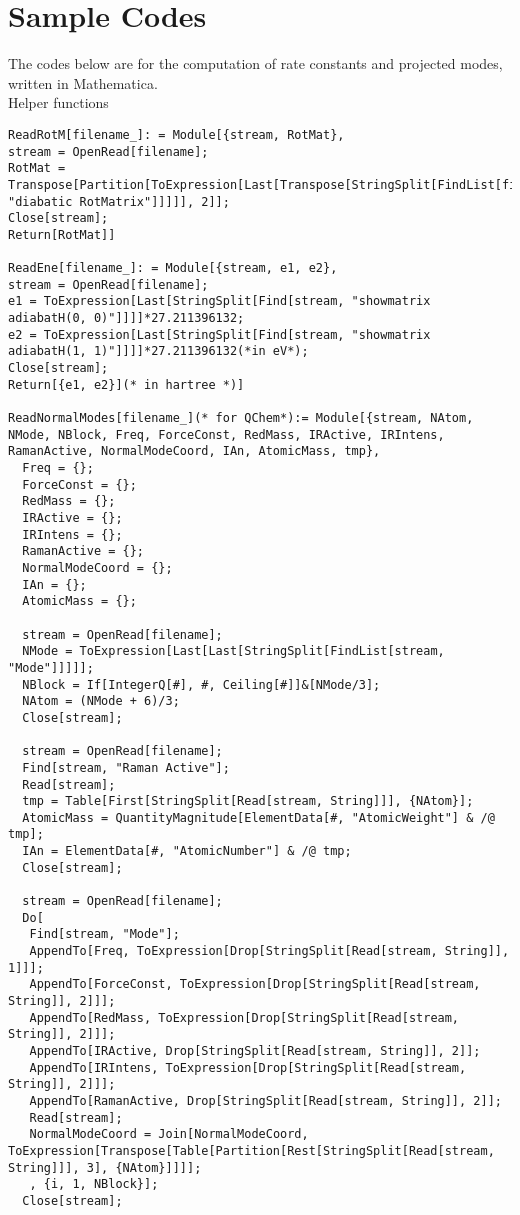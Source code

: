 \chapter{Sample Codes}
The codes below are for the computation of rate constants and projected modes, written in Mathematica.
\\\large{Helper functions}
\begin{lstlisting}
ReadRotM[filename_]: = Module[{stream, RotMat},
stream = OpenRead[filename];
RotMat = Transpose[Partition[ToExpression[Last[Transpose[StringSplit[FindList[filename, "diabatic RotMatrix"]]]]], 2]];
Close[stream];
Return[RotMat]]

ReadEne[filename_]: = Module[{stream, e1, e2},
stream = OpenRead[filename];
e1 = ToExpression[Last[StringSplit[Find[stream, "showmatrix adiabatH(0, 0)"]]]]*27.211396132;
e2 = ToExpression[Last[StringSplit[Find[stream, "showmatrix adiabatH(1, 1)"]]]]*27.211396132(*in eV*);
Close[stream];
Return[{e1, e2}](* in hartree *)]

ReadNormalModes[filename_](* for QChem*):= Module[{stream, NAtom, NMode, NBlock, Freq, ForceConst, RedMass, IRActive, IRIntens, RamanActive, NormalModeCoord, IAn, AtomicMass, tmp},
  Freq = {};
  ForceConst = {};
  RedMass = {};
  IRActive = {};
  IRIntens = {};
  RamanActive = {};
  NormalModeCoord = {};
  IAn = {};
  AtomicMass = {};

  stream = OpenRead[filename];
  NMode = ToExpression[Last[Last[StringSplit[FindList[stream, "Mode"]]]]];
  NBlock = If[IntegerQ[#], #, Ceiling[#]]&[NMode/3];
  NAtom = (NMode + 6)/3;
  Close[stream];

  stream = OpenRead[filename];
  Find[stream, "Raman Active"];
  Read[stream];
  tmp = Table[First[StringSplit[Read[stream, String]]], {NAtom}];
  AtomicMass = QuantityMagnitude[ElementData[#, "AtomicWeight"] & /@ tmp];
  IAn = ElementData[#, "AtomicNumber"] & /@ tmp;
  Close[stream];

  stream = OpenRead[filename];
  Do[
   Find[stream, "Mode"];
   AppendTo[Freq, ToExpression[Drop[StringSplit[Read[stream, String]], 1]]];
   AppendTo[ForceConst, ToExpression[Drop[StringSplit[Read[stream, String]], 2]]];
   AppendTo[RedMass, ToExpression[Drop[StringSplit[Read[stream, String]], 2]]];
   AppendTo[IRActive, Drop[StringSplit[Read[stream, String]], 2]];
   AppendTo[IRIntens, ToExpression[Drop[StringSplit[Read[stream, String]], 2]]];
   AppendTo[RamanActive, Drop[StringSplit[Read[stream, String]], 2]];
   Read[stream];
   NormalModeCoord = Join[NormalModeCoord, ToExpression[Transpose[Table[Partition[Rest[StringSplit[Read[stream, String]]], 3], {NAtom}]]]];
   , {i, 1, NBlock}];
  Close[stream];


\end{lstlisting}
